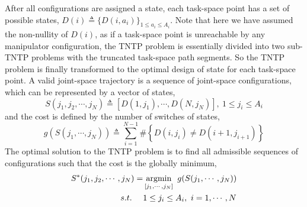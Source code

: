 \documentclass[letterpaper, 10 pt, journal, twoside]{ieeetran}  %
\begin{document}
After all configurations are assigned a state, each task-space point has a set of possible states, $D(i)\triangleq \{D(i, a_i)\}_{1\leq a_i\leq A_i}$. 
Note that here we have assumed the non-nullity of $D(i)$, as if a task-space point is unreachable by any manipulator configuration, the TNTP problem is essentially divided into two sub-TNTP problems with the truncated task-space path segments. 
So the TNTP problem is finally transformed to the optimal design of state for each task-space point. 
A valid joint-space trajectory is a sequence of joint-space configurations, which can be represented by a vector of states,
\begin{equation}
S(j_1, j_2, \cdots, j_N) \triangleq [D(1, j_1), \cdots, D(N, j_N)],\ 1\leq j_i\leq A_i
\end{equation}
and the cost is defined by the number of switches of states, 
\begin{equation}\label{equ:cost}
g\left(S(j_1, \cdots, j_N)\right) \triangleq \sum\limits_{i = 1}^{N-1}\#\left\{D(i, j_i)\neq D(i+1, j_{i+1})\right\}
\end{equation}
The optimal solution to the TNTP problem is to find all admissible sequences of configurations such that the cost is the globally minimum, 
\begin{equation}
\begin{aligned}
S^*(j_1, j_2, \cdots, j_N) = &\mathop{\rm argmin}\limits_{[j_1, \cdots, j_N]}~g(S(j_1, \cdots, j_N))\\
s.t.~~~~ &1\leq j_i\leq A_i,\ i = 1, \cdots, N
\end{aligned}
\end{equation}


\end{document}
